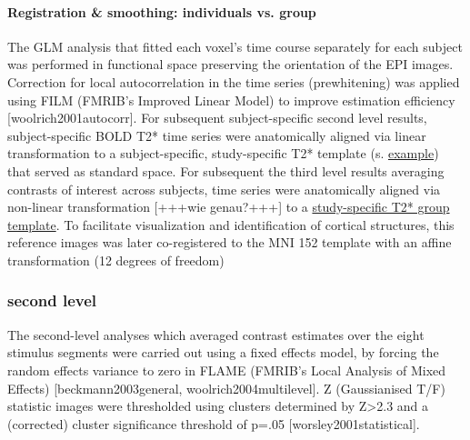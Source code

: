 \documentclass[english]{article}
\begin{document}
\paragraph{Registration \& smoothing: individuals vs. group}
The GLM analysis that fitted each voxel's time course separately for each subject was performed in functional space preserving the orientation of the EPI images. Correction for local autocorrelation in the time series (prewhitening) was applied using FILM (FMRIB's Improved Linear Model) to improve estimation efficiency [woolrich2001autocorr]. 
For subsequent subject-specific second level results, subject-specific BOLD T2* time series were anatomically aligned via linear transformation to a subject-specific, study-specific T2* template (s. \href{"https://github.com/psychoinformatics-de/studyforrest-data-templatetransforms/blob/master/sub-01/bold3Tp2/brain.nii.gz"}{example}) that served as standard space.
For subsequent the third level results averaging contrasts of interest across subjects, time series were anatomically aligned via non-linear transformation [+++wie genau?+++] to a \href{"https://github.com/psychoinformatics-de/studyforrest-data-templatetransforms/blob/master/templates/grpbold3Tp2/brain.nii.gz"}{study-specific T2* group template}. To facilitate visualization and identification of cortical structures, this reference images was later co-registered to the MNI 152 template with an affine transformation (12 degrees of freedom) 
\subsubsection{second level}
The second-level analyses which averaged contrast estimates over the eight stimulus segments were carried out using a fixed effects model, by forcing the random effects variance to zero in FLAME (FMRIB's Local Analysis of Mixed Effects) [beckmann2003general, woolrich2004multilevel]. Z (Gaussianised T/F) statistic images were thresholded using clusters determined by Z>2.3 and a (corrected) cluster significance threshold of p=.05 [worsley2001statistical].
\end{document}
